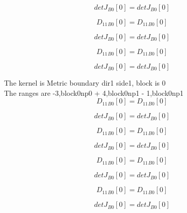 \documentclass{article}
\begin{document}
\begin{dmath}{detJ{_{B0}}}[{0}] = {detJ{_{B0}}}[{0}]\end{dmath}

\begin{dmath}{D_{11}{_{B0}}}[{0}] = {D_{11}{_{B0}}}[{0}]\end{dmath}

\begin{dmath}{detJ{_{B0}}}[{0}] = {detJ{_{B0}}}[{0}]\end{dmath}

\begin{dmath}{D_{11}{_{B0}}}[{0}] = {D_{11}{_{B0}}}[{0}]\end{dmath}

\begin{dmath}{detJ{_{B0}}}[{0}] = {detJ{_{B0}}}[{0}]\end{dmath}

\noindent The kernel is Metric boundary dir1 side1, block is 0\\\noindent The ranges are -3,block0np0 + 4,block0np1 - 1,block0np1\\\begin{dmath}{D_{11}{_{B0}}}[{0}] = {D_{11}{_{B0}}}[{0}]\end{dmath}

\begin{dmath}{detJ{_{B0}}}[{0}] = {detJ{_{B0}}}[{0}]\end{dmath}

\begin{dmath}{D_{11}{_{B0}}}[{0}] = {D_{11}{_{B0}}}[{0}]\end{dmath}

\begin{dmath}{detJ{_{B0}}}[{0}] = {detJ{_{B0}}}[{0}]\end{dmath}

\begin{dmath}{D_{11}{_{B0}}}[{0}] = {D_{11}{_{B0}}}[{0}]\end{dmath}

\begin{dmath}{detJ{_{B0}}}[{0}] = {detJ{_{B0}}}[{0}]\end{dmath}

\begin{dmath}{D_{11}{_{B0}}}[{0}] = {D_{11}{_{B0}}}[{0}]\end{dmath}

\begin{dmath}{detJ{_{B0}}}[{0}] = {detJ{_{B0}}}[{0}]\end{dmath}
\end{document}
